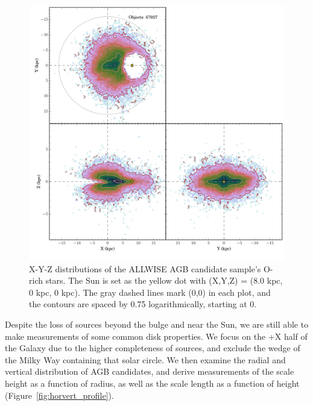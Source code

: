 \begin{figure}[h]
\centering
\includegraphics[width=5in]{figs/orich_candidates_xyz.pdf}
\caption{X-Y-Z distributions of the ALLWISE AGB candidate sample's O-rich stars. The Sun is set as the yellow dot with (X,Y,Z) = (8.0 kpc, 0 kpc, 0 kpc). The gray dashed lines mark (0,0) in each plot, and the contours are spaced by 0.75 logarithmically, starting at 0.}
\label{fig:xyz_candidates}
\end{figure}

Despite the loss of sources beyond the bulge and near the Sun, we are still able to make measurements of some common disk properties. We focus on the +X half of the Galaxy due to the higher completeness of sources, and exclude the wedge of the Milky Way containing that solar circle. We then examine the radial and vertical distribution of AGB candidates, and derive measurements of the scale height as a function of radius, as well as the scale length as a function of height (Figure~\ref{fig:horvert_profile}).

